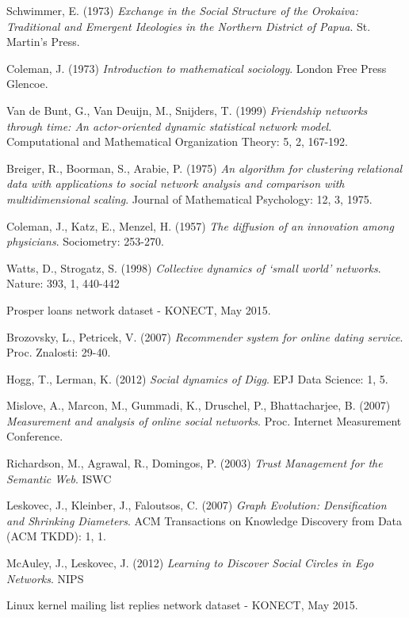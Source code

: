 \documentclass[3p,times]{elsarticle}
\begin{document}
\begin{thebibliography}{9}
	Schwimmer, E. (1973)
	\textit{Exchange in the Social Structure of the Orokaiva: Traditional and Emergent Ideologies in the Northern District of Papua}.
	St. Martin's Press.
	
	Coleman, J. (1973)
	\textit{Introduction to mathematical sociology}.
	London Free Press Glencoe.
	
	Van de Bunt, G., Van Deuijn, M., Snijders, T. (1999)
	\textit{Friendship networks through time: An actor-oriented dynamic statistical network model}.
	Computational and Mathematical Organization Theory: 5, 2, 167-192.
	
	Breiger, R., Boorman, S., Arabie, P. (1975)
	\textit{An algorithm for clustering relational data with applications to social network analysis and comparison with multidimensional scaling}.
	Journal of Mathematical Psychology: 12, 3, 1975.
	
	Coleman, J., Katz, E., Menzel, H. (1957)
	\textit{The diffusion of an innovation among physicians}.
	Sociometry: 253-270.
	
	Watts, D., Strogatz, S. (1998)
	\textit{Collective dynamics of `small world' networks}.
	Nature: 393, 1, 440-442
	
	Prosper loans network dataset - KONECT, May 2015.
	
	Brozovsky, L., Petricek, V. (2007)
	\textit{Recommender system for online dating service}.
	Proc. Znalosti: 29-40.
	
	Hogg, T., Lerman, K. (2012)
	\textit{Social dynamics of Digg}.
	EPJ Data Science: 1, 5.
	
	Mislove, A., Marcon, M., Gummadi, K., Druschel, P., Bhattacharjee, B. (2007)
	\textit{Measurement and analysis of online social networks}.
	Proc. Internet Measurement Conference.
	
	Richardson, M., Agrawal, R., Domingos, P. (2003)
	\textit{Trust Management for the Semantic Web}.
	ISWC
	
	Leskovec, J., Kleinber, J., Faloutsos, C. (2007)
	\textit{Graph Evolution: Densification and Shrinking Diameters}.
	ACM Transactions on Knowledge Discovery from Data (ACM TKDD): 1, 1.
	
	McAuley, J., Leskovec, J. (2012)
	\textit{Learning to Discover Social Circles in Ego Networks}.
	NIPS
	
	Linux kernel mailing list replies network dataset - KONECT, May 2015.
	

\end{thebibliography}
\end{document}
